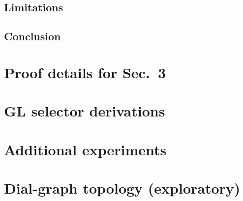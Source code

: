 \documentclass{article}
\begin{document}
	\subsection{Limitations}

	\subsection{Conclusion}

\appendix
\section{Proof details for Sec.~3}
\section{GL selector derivations}
\section{Additional experiments}
\section{Dial-graph topology (exploratory)}
\end{document}
